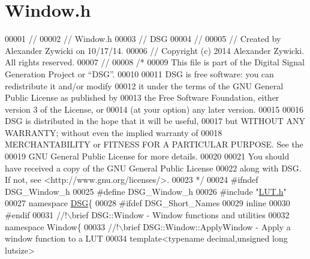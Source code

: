 \hypertarget{_window_8h_source}{\section{Window.\+h}
\label{_window_8h_source}
}

\begin{DoxyCode}
00001 \textcolor{comment}{//}
00002 \textcolor{comment}{//  Window.h}
00003 \textcolor{comment}{//  DSG}
00004 \textcolor{comment}{//}
00005 \textcolor{comment}{//  Created by Alexander Zywicki on 10/17/14.}
00006 \textcolor{comment}{//  Copyright (c) 2014 Alexander Zywicki. All rights reserved.}
00007 \textcolor{comment}{//}
00008 \textcolor{comment}{/*}
00009 \textcolor{comment}{ This file is part of the Digital Signal Generation Project or “DSG”.}
00010 \textcolor{comment}{}
00011 \textcolor{comment}{ DSG is free software: you can redistribute it and/or modify}
00012 \textcolor{comment}{ it under the terms of the GNU General Public License as published by}
00013 \textcolor{comment}{ the Free Software Foundation, either version 3 of the License, or}
00014 \textcolor{comment}{ (at your option) any later version.}
00015 \textcolor{comment}{}
00016 \textcolor{comment}{ DSG is distributed in the hope that it will be useful,}
00017 \textcolor{comment}{ but WITHOUT ANY WARRANTY; without even the implied warranty of}
00018 \textcolor{comment}{ MERCHANTABILITY or FITNESS FOR A PARTICULAR PURPOSE.  See the}
00019 \textcolor{comment}{ GNU General Public License for more details.}
00020 \textcolor{comment}{}
00021 \textcolor{comment}{ You should have received a copy of the GNU General Public License}
00022 \textcolor{comment}{ along with DSG.  If not, see <http://www.gnu.org/licenses/>.}
00023 \textcolor{comment}{ */}
00024 \textcolor{preprocessor}{#ifndef DSG\_Window\_h}
00025 \textcolor{preprocessor}{#define DSG\_Window\_h}
00026 \textcolor{preprocessor}{#include "\hyperlink{_l_u_t_8h}{LUT.h}"}
00027 \textcolor{keyword}{namespace }\hyperlink{namespace_d_s_g}{DSG}\{
00028 \textcolor{preprocessor}{#ifdef DSG\_Short\_Names}
00029     \textcolor{keyword}{inline}
00030 \textcolor{preprocessor}{#endif}
00031 \textcolor{comment}{    //!\(\backslash\)brief DSG::Window - Window functions and utilities}
00032 \textcolor{comment}{}    \textcolor{keyword}{namespace }Window\{\textcolor{comment}{}
00033 \textcolor{comment}{        //!\(\backslash\)brief DSG::Window::ApplyWindow - Apply a window function to a LUT}
00034 \textcolor{comment}{}        \textcolor{keyword}{template}<\textcolor{keyword}{typename} decimal,\textcolor{keywordtype}{unsigned} \textcolor{keywordtype}{long} lutsize>

\end{DoxyCode}
